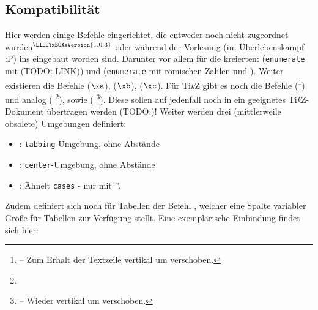 \subsection[Kompatibilität \LILLYxBOXxVersion{\small 1.0.3}]{Kompatibilität}
{\centering {}\vspace*{0.5\baselineskip}\par}
Hier werden einige Befehle eingerichtet, die entweder noch nicht zugeordnet wurden\({}^{\tiny \LILLYxBOXxVersion{\tiny 1.0.3}}\) oder während der Vorlesung (im Überlebenskampf :P) ins  eingebaut worden sind.
Darunter vor allem für die \la kreierten:  (\verb|enumerate| mit  (TODO: LINK)) und  (\verb|enumerate| mit römischen Zahlen und ). \medskip\newline
Weiter existieren die Befehle  ($\xa$),  ($\xb$),  ($\xc$). \medskip\newline
Für Ti\textit{k}Z gibt es noch die Befehle  (\footnote{ -- Zum Erhalt der Textzeile vertikal um  verschoben.}) und analog  ( \footnote{}), sowie  ( \footnote{ -- Wieder vertikal um  verschoben.}). Diese sollen auf jedenfall noch in ein geeignetes Ti\textit{k}Z-Dokument übertragen werden (TODO:)!\newline\marginpar{}%
Weiter werden drei (mittlerweile obsolete) Umgebungen definiert: \begin{itemize}[label=$\diamond$]\narrowitems
    \item {}:  \verb|tabbing|-Umgebung, ohne Abstände
    \item {}: \verb|center|-Umgebung, ohne Abstände
    \item {}: Ähnelt \verb|cases| - nur mit '\T{]}'.
\end{itemize}
Zudem definiert sich noch für Tabellen der Befehl , welcher eine Spalte variabler Größe für Tabellen zur Verfügung stellt. Eine exemplarische Einbindung findet sich hier:
